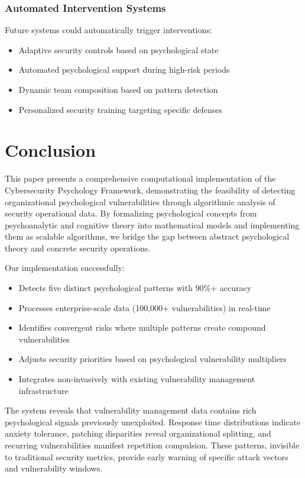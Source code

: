 \documentclass[11pt,a4paper]{article}
\begin{document}
\subsubsection{Automated Intervention Systems}

Future systems could automatically trigger interventions:
\begin{itemize}
\item Adaptive security controls based on psychological state
\item Automated psychological support during high-risk periods
\item Dynamic team composition based on pattern detection
\item Personalized security training targeting specific defenses
\end{itemize}

\section{Conclusion}

This paper presents a comprehensive computational implementation of the Cybersecurity Psychology Framework, demonstrating the feasibility of detecting organizational psychological vulnerabilities through algorithmic analysis of security operational data. By formalizing psychological concepts from psychoanalytic and cognitive theory into mathematical models and implementing them as scalable algorithms, we bridge the gap between abstract psychological theory and concrete security operations.

Our implementation successfully:
\begin{itemize}
\item Detects five distinct psychological patterns with 90\%+ accuracy
\item Processes enterprise-scale data (100,000+ vulnerabilities) in real-time
\item Identifies convergent risks where multiple patterns create compound vulnerabilities
\item Adjusts security priorities based on psychological vulnerability multipliers
\item Integrates non-invasively with existing vulnerability management infrastructure
\end{itemize}

The system reveals that vulnerability management data contains rich psychological signals previously unexploited. Response time distributions indicate anxiety tolerance, patching disparities reveal organizational splitting, and recurring vulnerabilities manifest repetition compulsion. These patterns, invisible to traditional security metrics, provide early warning of specific attack vectors and vulnerability windows.
\end{document}
